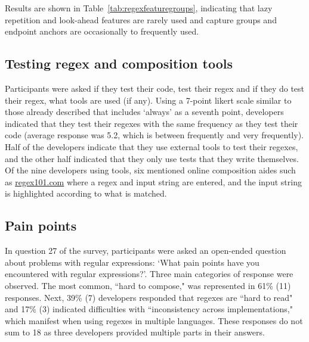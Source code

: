 Results are shown in Table~\ref{tab:regexfeaturegroups}, indicating that lazy repetition and look-ahead features are rarely used and capture groups and endpoint anchors are occasionally to frequently used.

\subsection{Testing regex and composition tools}

Participants were asked if they test their code, test their regex and if they do test their regex, what tools are used (if any).  Using a 7-point likert scale similar to those already described that includes `always' as a seventh point, developers indicated that they test their regexes with the same frequency as they test their code (average response was 5.2, which is between frequently and very frequently).  Half of the  developers indicate that they use external tools to test their regexes, and the other half indicated that they only use tests that they write themselves. Of the nine developers using tools, six mentioned online composition aides such as \url{regex101.com} where a regex and input string are entered, and the input string is highlighted according to what is matched.

\subsection{Pain points}
\label{sec:painPoints}
In question 27 of the survey, participants were asked an open-ended question about problems with regular expressions: `What pain points have you encountered with regular expressions?'.  Three main categories of response were observed. The most common, ``hard to compose," was represented in 61\% (11) responses. Next, 39\% (7) developers responded that regexes are ``hard to read" and 17\% (3) indicated difficulties with ``inconsistency across implementations," which manifest when using regexes in multiple languages. These responses do not sum to 18 as three developers provided multiple parts in their answers.

